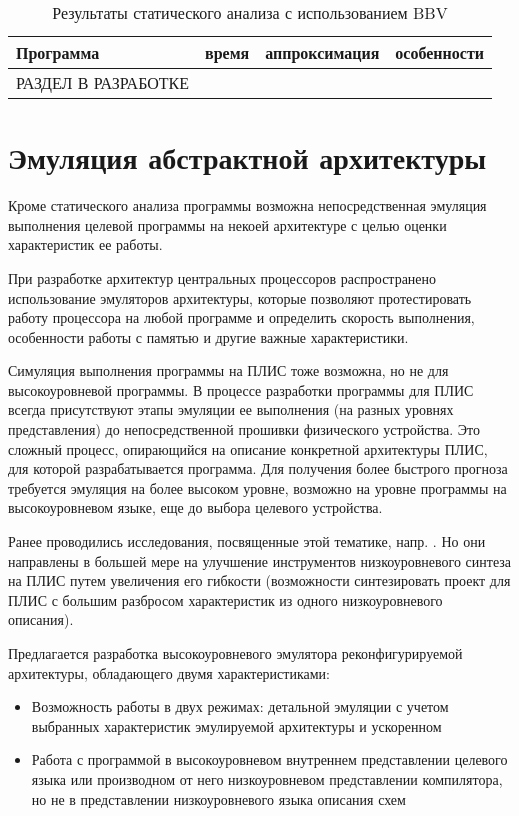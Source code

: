 \documentclass[utf8]{psta}%
\begin{document}
\begin{table}
    \begin{tabular}{ | p{1.5cm} | p{2cm} | p{1cm} | p{6cm} |}
    \hline
    Программа & время & аппроксимация & особенности \\ \hline
    РАЗДЕЛ В РАЗРАБОТКЕ & &  & \\ \hline
    \end{tabular} 
    \caption{Результаты статического анализа с использованием BBV}
    \label{table:CHStoneSingularLoops}
\end{table}

\section{Эмуляция абстрактной архитектуры}

Кроме статического анализа программы возможна непосредственная эмуляция выполнения целевой программы на некоей архитектуре с целью оценки характеристик ее работы.

При разработке архитектур центральных процессоров распространено использование эмуляторов архитектуры, которые позволяют протестировать работу процессора на любой программе и определить скорость выполнения, особенности работы с памятью и другие важные характеристики. 

Симуляция выполнения программы на ПЛИС тоже возможна, но не для высокоуровневой программы. В процессе разработки программы для ПЛИС всегда присутствуют этапы эмуляции ее выполнения (на разных уровнях представления) до непосредственной прошивки физического устройства. Это сложный процесс, опирающийся на описание конкретной архитектуры ПЛИС, для которой разрабатывается программа. Для получения более быстрого прогноза требуется эмуляция на более высоком уровне, возможно на уровне программы на высокоуровневом языке, еще до выбора целевого устройства.

Ранее проводились исследования, посвященные этой тематике, напр. \cite{Takamaeda-Yamazaki2014}. Но они направлены в большей мере на улучшение инструментов низкоуровневого синтеза на ПЛИС путем увеличения его гибкости (возможности синтезировать проект для ПЛИС с большим разбросом характеристик из одного низкоуровневого описания).

Предлагается разработка высокоуровневого эмулятора реконфигурируемой архитектуры, обладающего двумя характеристиками:

\begin{itemize}
    \item Возможность работы в двух режимах: детальной эмуляции с учетом выбранных характеристик эмулируемой архитектуры и ускоренном
    \item Работа с программой в высокоуровневом внутреннем представлении целевого языка или производном от него низкоуровневом представлении компилятора, но не в представлении низкоуровневого языка описания схем
    
\end{itemize}
\end{document}
